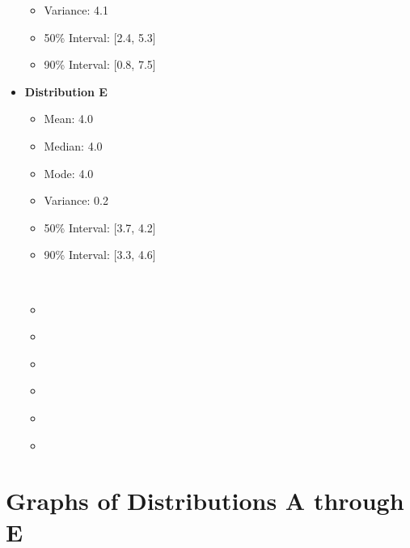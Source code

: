\documentclass[12pt]{article}
\begin{document}
\begin{multicols}{2}
\begin{itemize}
\begin{itemize}
            \item Variance: 4.1
            \item 50\% Interval: [2.4, 5.3]
            \item 90\% Interval: [0.8, 7.5]
        \end{itemize}
        \item \textbf{Distribution E}
        \begin{itemize}
            \item Mean: 4.0
            \item Median: 4.0
            \item Mode: 4.0
            \item Variance: 0.2
            \item 50\% Interval: [3.7, 4.2]
            \item 90\% Interval: [3.3, 4.6]
        \end{itemize}
        \item[\(\phantom{bullet}\)] \(\phantom{\textbf{Distribution E}}\)
        \begin{itemize}[label=\(\phantom{\bullet}\)]
            \item \(\phantom{Mean: 4.0}\)
            \item \(\phantom{Median: 4.0}\)
            \item \(\phantom{Mode: 4.0}\)
            \item \(\phantom{2}\)
            \item \(\phantom{3}\)
            \item \(\phantom{3}\)
        \end{itemize}
    \end{itemize}
\end{multicols}


\newpage

\section{Graphs of Distributions A through E}
\end{document}
